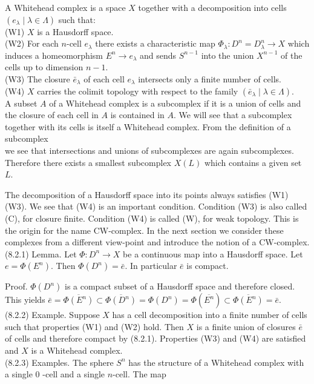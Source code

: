 \documentclass[10pt, letterpaper]{article}
\begin{document}
A Whitehead complex is a space $X$ together with a decomposition into cells $\left(e_{\lambda} \mid \lambda \in \Lambda\right)$ such that:\\
(W1) $X$ is a Hausdorff space.\\
(W2) For each $n$-cell $e_{\lambda}$ there exists a characteristic map $\Phi_{\lambda}: D^{n}=D_{\lambda}^{n} \rightarrow X$ which induces a homeomorphism $E^{n} \rightarrow e_{\lambda}$ and sends $S^{n-1}$ into the union $X^{n-1}$ of the cells up to dimension $n-1$.\\
(W3) The closure $\bar{e}_{\lambda}$ of each cell $e_{\lambda}$ intersects only a finite number of cells.\\
(W4) $X$ carries the colimit topology with respect to the family $\left(\bar{e}_{\lambda} \mid \lambda \in \Lambda\right)$.\\
A subset $A$ of a Whitehead complex is a subcomplex if it is a union of cells and the closure of each cell in $A$ is contained in $A$. We will see that a subcomplex together with its cells is itself a Whitehead complex. From the definition of a subcomplex\\
we see that intersections and unions of subcomplexes are again subcomplexes. Therefore there exists a smallest subcomplex $X(L)$ which contains a given set $L$.

The decomposition of a Hausdorff space into its points always satisfies (W1)(W3). We see that (W4) is an important condition. Condition (W3) is also called (C), for closure finite. Condition (W4) is called (W), for weak topology. This is the origin for the name CW-complex. In the next section we consider these complexes from a different view-point and introduce the notion of a CW-complex.\\
(8.2.1) Lemma. Let $\Phi: D^{n} \rightarrow X$ be a continuous map into a Hausdorff space. Let $e=\Phi\left(E^{n}\right)$. Then $\Phi\left(D^{n}\right)=\bar{e}$. In particular $\bar{e}$ is compact.

Proof. $\Phi\left(D^{n}\right)$ is a compact subset of a Hausdorff space and therefore closed. This yields $\bar{e}=\overline{\Phi\left(E^{n}\right)} \subset \overline{\Phi\left(D^{n}\right)}=\Phi\left(D^{n}\right)=\Phi\left(\overline{E^{n}}\right) \subset \overline{\Phi\left(E^{n}\right)}=\bar{e}$.\\
(8.2.2) Example. Suppose $X$ has a cell decomposition into a finite number of cells such that properties (W1) and (W2) hold. Then $X$ is a finite union of closures $\bar{e}$ of cells and therefore compact by (8.2.1). Properties (W3) and (W4) are satisfied and $X$ is a Whitehead complex.\\
(8.2.3) Examples. The sphere $S^{n}$ has the structure of a Whitehead complex with a single 0 -cell and a single $n$-cell. The map
\end{document}
